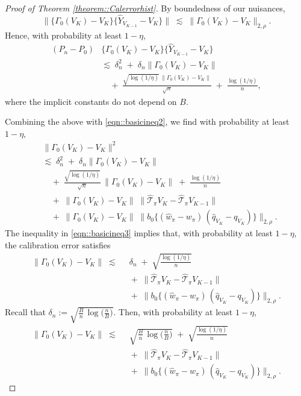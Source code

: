 \documentclass{article}
\theoremstyle{plain}
\theoremstyle{definition}
\theoremstyle{remark}
\begin{document}
\begin{proof}[Proof of Theorem \ref{theorem::Calerrorhist}]
By boundedness of our nuisances,
\[
\big\|
\{\Gamma_0(V_K) - V_K\}
\{\widehat Y_{V_{K-1}} - V_K\}
\big\|
\;\lesssim\;
\|\Gamma_0(V_K) - V_K\|_{2,\rho}.
\]
Hence, with probability at least \(1 - \eta\),
\[
\begin{aligned}
(P_n - P_0)
&\Big\{
\Gamma_0(V_K) - V_K
\Big\}
\Big\{
\widehat Y_{V_{K-1}}
- V_K
\Big\} \\
&\lesssim\;
\delta_n^2
\;+\;
\delta_n \|\Gamma_0(V_K) - V_K\| \\[0.35em]
&\quad+\;
\frac{\sqrt{\log(1/\eta)}\,\|\Gamma_0(V_K) - V_K\|}{\sqrt{n}}
\;+\;
\frac{\log(1/\eta)}{n},
\end{aligned}
\]
where the implicit constants do not depend on \(B\).



Combining the above with \eqref{eqn::basicineq2}, we find with probability at least \(1 - \eta\),
\begin{equation}
\label{eqn::basicineq3}
\begin{aligned}
&\|\Gamma_0(V_K) - V_K\|^2\\
&\lesssim\;
\delta_n^2
\;+\;
\delta_n \|\Gamma_0(V_K) - V_K\|\\
&\quad+\;
\frac{\sqrt{\log(1/\eta)}}{\sqrt{n}}\,
\|\Gamma_0(V_K) - V_K\|
\;+\;
\frac{\log(1/\eta)}{n}
\\[0.4em]
&\quad+\;
\|\Gamma_0(V_K) - V_K\|\;
\big\|
\widehat{\mathcal T}_\pi V_K
- \widehat{\mathcal T}_\pi V_{K-1}
\big\|
\\[0.4em]
&\quad+\;
\|\Gamma_0(V_K) - V_K\|\;
\big\|
b_0\{(\widehat w_{\pi} - w_{\pi})\,
(\widehat q_{V_K} - q_{V_K})\}
\big\|_{2,\rho}.
\end{aligned}
\end{equation}
The inequality in \eqref{eqn::basicineq3} implies that, 
with probability at least $1-\eta$, the calibration error satisfies
\begin{align*}
\|\Gamma_0(V_K) - V_K\|
\;\lesssim\;&\;
\delta_n
\;+\;
\sqrt{\frac{\log(1/\eta)}{n}}
\\[0.4em]
&\;+\;
\big\|
\widehat{\mathcal T}_\pi V_K
- \widehat{\mathcal T}_\pi V_{K-1}
\big\|
\\[0.4em]
&\;+\;
\big\|
b_0\{(\widehat w_{\pi} - w_{\pi})\,
(\widehat q_{V_K} - q_{V_K})\}
\big\|_{2,\rho}.
\end{align*}
Recall that $\delta_n := \sqrt{\frac{B}{n}\,\log\Big(\frac{n}{B}\Big)}$. Then,  with probability at least $1-\eta$,
\begin{align*}
\|\Gamma_0(V_K) - V_K\|
\;\lesssim\;&\;
\sqrt{\frac{B}{n}\,\log\Big(\frac{n}{B}\Big)}
\;+\;
\sqrt{\frac{\log(1/\eta)}{n}}
\\[0.4em]
&\;+\;
\big\|
\widehat{\mathcal T}_\pi V_K
- \widehat{\mathcal T}_\pi V_{K-1}
\big\|
\\[0.4em]
&\;+\;
\big\|
b_0\{(\widehat w_{\pi} - w_{\pi})\,
(\widehat q_{V_K} - q_{V_K})\}
\big\|_{2,\rho}.
\end{align*}
\end{proof}
\end{document}
